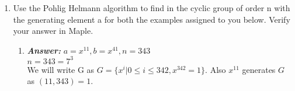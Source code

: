 \documentclass[11pt,a4paper,fleqn]{article}
\makeatletter
\newcommand{\tpmod}[1]{{\@displayfalse\pmod{#1}}}
\newcommand\Tstrut{\rule{0pt}{2.6ex}}         %
\makeatother
\begin{document}
\begin{enumerate}[1.]
\begin{flushleft}
\begin{enumerate}
\begin{enumerate}[Step 1.]
\begin{table}[H]
{\begin{tabular}{|l|l|}
						\hline
						8 & $24.26^{-8} = 24.26^{44} = 49$ \Tstrut\\
						\hline
					\end{tabular}
					\caption{Step 3}}
			\end{table}
			\item We found a collision in both the tables for $value = 49$ where $i = 8$ and $mj = 8 \times 3$
			\item We calculate $t = (mj + i)\tpmod{53} = (8 \times 3 + 8)\tpmod{53} \equiv 32\tpmod{53}$\\
			$\implies 26^{32} \equiv 24\tpmod{53}$
			\item Verifying the answer using Fast Modular Exponentiation:
			\begin{align*}
				& 26^2 \equiv 40\tpmod{53} \\
				& \therefore 26^4 = (26^2)^2 = 40^2 \equiv 10\tpmod{53} \\
				& \implies 26^{16} = (26^4)^4 = 10^4 \equiv 36\tpmod{53} \\
				& \implies 26^{32} = (26^{16})^2 = 36^2 \equiv 24\tpmod{53} \text{ and hence the answer}
			\end{align*}
		\end{enumerate}	
		\end{enumerate}
		\end{flushleft}
		\item Use the Pohlig Helmann algorithm to find in the cyclic group of order n with the generating element a for both the examples assigned to you below. Verify your answer in Maple.
		\begin{flushleft}
			\begin{enumerate}
				\item \textbf{\textit{Answer:}} $a = x^{11}, b = x^{41}, n = 343$ \\ \bigbreak
				$n = 343 = 7^3$\\
				We will write G as $G = \{x^i | 0 \le i \le 342, x^{342} = 1\}$. Also $x^{11}$ generates $G$ as $(11, 343) = 1$.\\
				

\end{enumerate}
\end{flushleft}
\end{enumerate}
\end{document}
